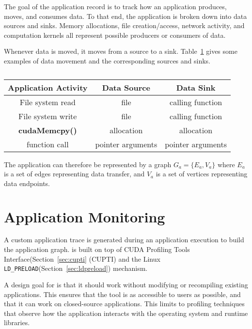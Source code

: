 The goal of the application record is to track how an application produces, moves, and consumes data.
To that end, the application is broken down into data sources and sinks.
Memory allocations, file creation/access, network activity, and computation kernels all represent possible producers or consumers of data.

Whenever data is moved, it moves from a source to a sink.
Table~\ref{tab:source-sink-example} gives some examples of data movement and the corresponding sources and sinks.

\begin{table}[ht]
    \centering
    \caption{}
    \label{tab:source-sink-example}
    \begin{tabular}{|c|c|c|}
    \hline
    \textbf{Application Activity} & \textbf{Data Source} & \textbf{Data Sink} \\ \hline
    File system read  & file & calling function \\ \hline
    File system write  & file & calling function \\ \hline
    \textbf{cudaMemcpy()} & allocation & allocation \\ \hline
    function call & pointer arguments & pointer arguments \\ \hline
    \end{tabular}
\end{table}

The application can therefore be represented by a graph $G_a = \{E_a,V_a\}$ where $E_a$ is a set of edges representing data transfer, and $V_a$ is a set of vertices representing data endpoints.

\section{Application Monitoring}

A custom application trace is generated during an application execution to build the application graph.
 is built on top of CUDA Profiling Tools Interface(Section~\ref{sec:cupti} (CUPTI) and the Linux \texttt{LD\_PRELOAD}(Section~\ref{sec:ldpreload}) mechanism.

A design goal for  is that it should work without modifying or recompiling existing applications.
This ensures that the tool is as accessible to users as possible, and that it can work on closed-source applications.
This limits  to profiling techniques that observe how the application interacts with the operating system and runtime libraries.

